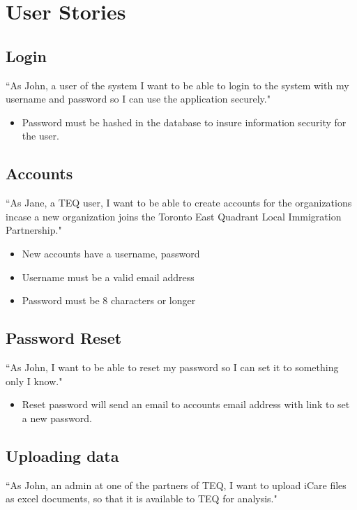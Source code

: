 \documentclass[12pt]{article}
\begin{document}
\pagebreak

\section{User Stories}
\subsection{Login} ``As John, a user of the system I want to be able to login to the system with my username and password so I can use the application securely."
\begin{itemize}
\item Password must be hashed in the database to insure information security for the user.
\end{itemize}

\subsection{Accounts} ``As Jane, a TEQ user, I want to be able to create accounts for the organizations incase a new organization joins the Toronto East Quadrant Local Immigration Partnership."
\begin{itemize}
\item New accounts have a username, password
\item Username must be a valid email address
\item Password must be 8 characters or longer

\end{itemize}

\subsection{Password Reset}
``As John, I want to be able to reset my password so I can set it to something only I know."
\begin{itemize}
\item Reset password will send an email to accounts email address with link to set a new password.

\end{itemize}

\subsection{Uploading data}
``As John, an admin at one of the partners of TEQ, I want to upload iCare files as excel documents, so that it is available to TEQ for analysis."
\end{document}
